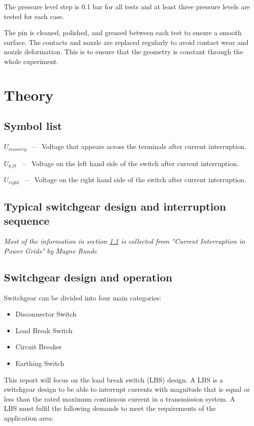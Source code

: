 \documentclass[10pt,a4paper]{article} %
\begin{document}
The pressure level step is 0.1 bar for all tests and at least three pressure levels are tested for each case.\newline

The pin is cleaned, polished, and greased between each test to ensure a smooth surface. The contacts and nozzle are replaced regularly to avoid contact wear and nozzle deformation. This is to ensure that the geometry is constant through the whole experiment.






\newpage
\section{Theory}
\subsection*{Symbol list}
\begin{description}
\item{$U_{recovery}$} \ -- \ Voltage that appears across the terminals after current interruption.
\item{$U_{left}$} \ -- \ Voltage on the left hand side of the switch after current interruption.
\item{$U_{right}$} \ -- \ Voltage on the right hand side of the switch after current interruption.
\end{description}
\newpage
\subsection{Typical switchgear design and interruption sequence} \label{sec:genDes}
\textit{Most of the information in section \ref{sec:genDes} is collected from "Current Interruption in Power Grids" by Magne Runde} \newline

\subsection{Switchgear design and operation} \label{sec:InterruptCurrent}
Switchgear can be divided into four main categories:
\begin{itemize}
\item Disconnector Switch
\item Load Break Switch
\item Circuit Breaker
\item Earthing Switch
\end{itemize}
This report will focus on the load break switch (LBS) design. A LBS is a switchgear design to be able to interrupt currents with magnitude that is equal or less than the rated maximum continuous current in a transmission system. A LBS must fulfil the following demands to meet the requirements of the application area:
\end{document}
